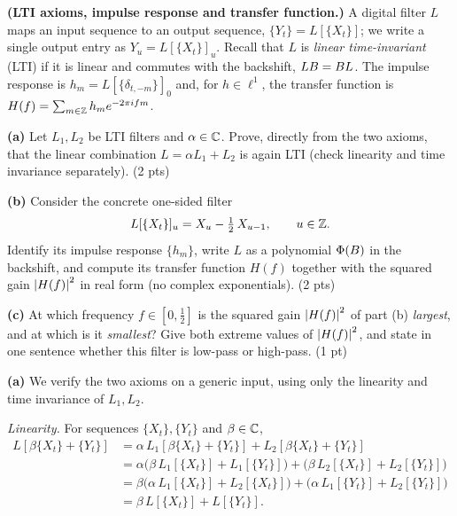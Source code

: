 \documentclass[11pt]{article}
\newcommand{\filt}{L}
\begin{document}

\statementstart
\textbf{(LTI axioms, impulse response and transfer function.)} A digital filter $\filt$ maps an input sequence to an output sequence, $\{Y_t\}=\filt[\{X_t\}]$; we write a single output entry as $Y_u=\filt[\{X_t\}]_u$. Recall that $\filt$ is \emph{linear time-invariant} (LTI) if it is linear and commutes with the backshift, $\filt\Bsh=\Bsh\filt$. The impulse response is $h_m=\filt[\{\delta_{t,-m}\}]_0$ and, for $h\in\ell^1$, the transfer function is $H(f)=\sum_{m\in\mathbb{Z}}h_m e^{-2\pi i fm}$.

\textbf{(a)} Let $\filt_1,\filt_2$ be LTI filters and $\alpha\in\mathbb{C}$. Prove, directly from the two axioms, that the linear combination $\filt=\alpha\filt_1+\filt_2$ is again LTI (check linearity and time invariance separately). \hfill(2 pts)

\textbf{(b)} Consider the concrete one-sided filter
\[
\filt[\{X_t\}]_u=X_u-\tfrac12\,X_{u-1},\qquad u\in\Ints .
\]
Identify its impulse response $\{h_m\}$, write $\filt$ as a polynomial $\Phi(B)$ in the backshift, and compute its transfer function $H(f)$ together with the squared gain $\left\lvert H(f) \right\rvert^2$ in real form (no complex exponentials). \hfill(2 pts)

\textbf{(c)} At which frequency $f\in[0,\tfrac12]$ is the squared gain $\left\lvert H(f) \right\rvert^2$ of part (b) \emph{largest}, and at which is it \emph{smallest}? Give both extreme values of $\left\lvert H(f) \right\rvert^2$, and state in one sentence whether this filter is low-pass or high-pass. \hfill(1 pt)
\statementend

\textbf{(a)} We verify the two axioms on a generic input, using only the linearity and time invariance of $\filt_1,\filt_2$.

\emph{Linearity.} For sequences $\{X_t\},\{Y_t\}$ and $\beta\in\mathbb{C}$,
\[
\begin{aligned}
\filt[\beta\{X_t\}+\{Y_t\}]
&=\alpha\,\filt_1[\beta\{X_t\}+\{Y_t\}]+\filt_2[\beta\{X_t\}+\{Y_t\}]\\
&=\alpha\bigl(\beta\,\filt_1[\{X_t\}]+\filt_1[\{Y_t\}]\bigr)
 +\bigl(\beta\,\filt_2[\{X_t\}]+\filt_2[\{Y_t\}]\bigr)\\
&=\beta\bigl(\alpha\,\filt_1[\{X_t\}]+\filt_2[\{X_t\}]\bigr)
 +\bigl(\alpha\,\filt_1[\{Y_t\}]+\filt_2[\{Y_t\}]\bigr)\\
&=\beta\,\filt[\{X_t\}]+\filt[\{Y_t\}].
\end{aligned}
\]
\end{document}

